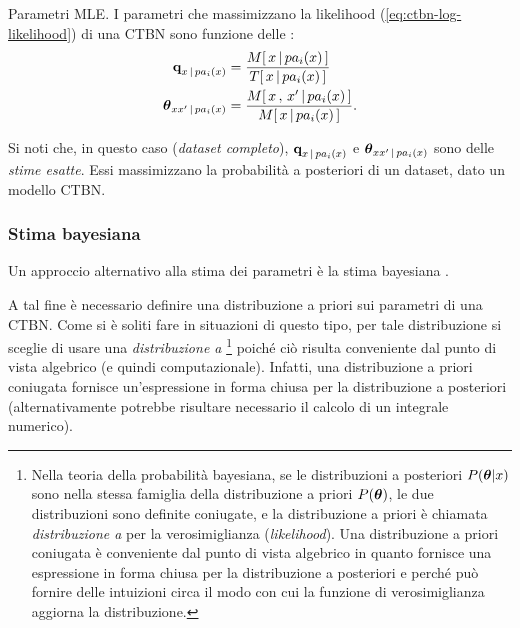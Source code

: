 \begin{teorema}{Parametri \ac{MLE}.}
    I parametri che massimizzano la likelihood (\autoref{eq:ctbn-log-likelihood}) di una \acl{CTBN} sono funzione delle \keyword{\stats{}}:
    \begin{equation}
        \label{eq:ctbn-params}
        \normalfont
        \begin{split}
        \param{q}_{\setel{x}\,\arrowvert\,pa_i(\setel{x})}&=\frac{\mstat{x\,\arrowvert\,pa_i(\setel{x})}}{\tstat{\setel{x}\,\arrowvert\,pa_i(\setel{x})}} \\
        \param{$\theta$}_{\setel{x}\setel{x}^\prime\,\arrowvert\,pa_i(\setel{x})}&=\frac{\mstat[x]{\setel{x}^\prime\,\arrowvert\,pa_i(\setel{x})}}{\mstat{\setel{x}\,\arrowvert\,pa_i(\setel{x})}}\text{.}
        \end{split}
        \end{equation}
\end{teorema}
\normalfont
Si noti che, in questo caso (\emph{dataset completo}), $\boldsymbol{\textbf{\text{q}}}_{\mathnormal{x}\,\arrowvert\,pa_i(\mathnormal{x})}$ e $\boldsymbol{\textbf{\text{$\theta$}}}_{\mathnormal{x}\mathnormal{x}^\prime\,\arrowvert\,pa_i(\mathnormal{x})}$ sono delle \emph{stime esatte}. Essi massimizzano la probabilità a posteriori di un dataset, dato un modello \acs{CTBN}.

\subsubsection{Stima bayesiana}
\label{subsec:ctbn-bayesian-estimate}
Un approccio alternativo alla stima dei parametri è la stima bayesiana \citep[si veda][sottosezione 5.1.1]{Nodelman2007}.

A tal fine è necessario definire una distribuzione a priori sui parametri di una \acs{CTBN}. Come si è soliti fare in situazioni di questo tipo, per tale distribuzione si sceglie di usare una \emph{distribuzione a }\footnote{\label{note:conjugate-prior}Nella teoria della probabilità bayesiana, se le distribuzioni a posteriori $P(\boldsymbol{\textbf{\text{$\theta$}}}|\mathnormal{x})$ sono nella stessa famiglia della distribuzione a priori $P(\boldsymbol{\textbf{\text{$\theta$}}})$, le due distribuzioni sono definite coniugate, e la distribuzione a priori è chiamata \emph{distribuzione a } per la verosimiglianza (\emph{likelihood}). Una distribuzione a priori coniugata è conveniente dal punto di vista algebrico in quanto fornisce una espressione in forma chiusa per la distribuzione a posteriori e perché può fornire delle intuizioni circa il modo con cui la funzione di verosimiglianza aggiorna la distribuzione.} poiché ciò risulta conveniente dal punto di vista algebrico (e quindi computazionale). Infatti, una distribuzione a priori coniugata fornisce un'espressione in forma chiusa per la distribuzione a posteriori (alternativamente potrebbe risultare necessario il calcolo di un integrale numerico).

